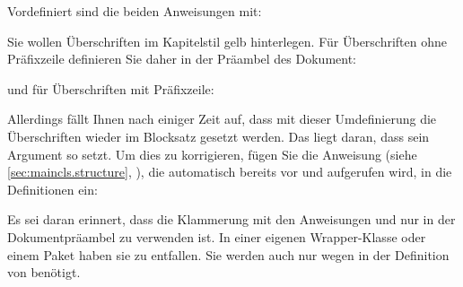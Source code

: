 Vordefiniert sind die beiden Anweisungen mit:
\begin{lstcode}
  \newcommand{\chapterlinesformat}[3]{%
    \@hangfrom{#2}{#3}%
  }
  \newcommand{\chapterlineswithprefixformat}[3]{#2#3}
\end{lstcode}

\begin{Example}
  Sie wollen Überschriften im Kapitelstil gelb hinterlegen. Für
  Überschriften ohne Präfixzeile definieren Sie daher in der Präambel des
  Dokument:
\begin{lstcode}[moretexcs={colorbox}]
  \makeatletter
  \renewcommand{\chapterlinesformat}[3]{%
    \colorbox{yellow}{%
      \parbox{\dimexpr\linewidth
                      -2\fboxrule-2\fboxsep}{%
        \@hangfrom{#2}#3%
      }%
    }%
  }
  \makeatother
\end{lstcode}
  und für Überschriften mit Präfixzeile:
\begin{lstcode}[moretexcs={colorbox}]
  \renewcommand{\chapterlineswithprefixformat}[3]{%
    \colorbox{yellow}{%
      \parbox{\dimexpr\linewidth
                      -2\fboxrule-2\fboxsep}{%
        #2#3%
      }%
    }%
  }
\end{lstcode}
  Allerdings fällt Ihnen nach einiger Zeit auf, dass mit dieser Umdefinierung
  die Überschriften wieder im Blocksatz gesetzt werden. Das liegt daran, dass
   sein Argument so setzt. Um dies zu korrigieren, fügen Sie die
  Anweisung  (siehe
  \autoref{sec:maincls.structure}, ),
  die automatisch bereits vor  und
   aufgerufen wird, in die Definitionen
  ein:
\begin{lstcode}[moretexcs={colorbox}]
  \makeatletter
  \renewcommand{\chapterlinesformat}[3]{%
    \colorbox{yellow}{%
      \parbox{\dimexpr\linewidth
                      -2\fboxrule-2\fboxsep}{%
        \raggedchapter
        \@hangfrom{#2}#3%
      }%
    }%
  }
  \makeatother
  \renewcommand{\chapterlineswithprefixformat}[3]{%
    \colorbox{yellow}{%
      \parbox{\dimexpr\linewidth
                      -2\fboxrule-2\fboxsep}{%
        \raggedchapter
        #2#3%
      }%
    }%
  }
\end{lstcode}
  Es sei daran erinnert, dass die Klammerung mit den Anweisungen
   und  nur in der Dokumentpräambel zu
  verwenden ist. In einer eigenen Wrapper-Klasse oder einem Paket haben sie zu
  entfallen. Sie werden auch nur wegen  in der Definition von
   benötigt.%
\end{Example}

